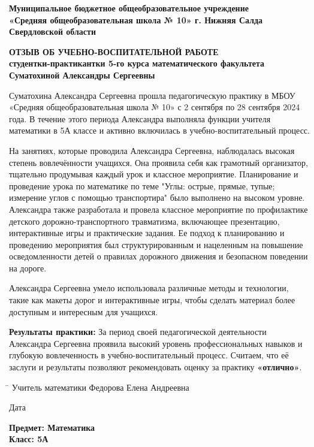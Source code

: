 \documentclass[a4paper,12pt]{article}
\begin{document}
\begin{center}
    \textbf{Муниципальное бюджетное общеобразовательное учреждение}\\
    \textbf{«Средняя общеобразовательная школа № 10» г. Нижняя Салда Свердловской области}\\
    \end{center}
\begin{center}
    \textbf{\large ОТЗЫВ ОБ УЧЕБНО-ВОСПИТАТЕЛЬНОЙ РАБОТЕ}\\
    \textbf{студентки-практикантки 5-го курса математического факультета}\\
    \textbf{Суматохиной Александры Сергеевны}
    \end{center}
\vspace{10mm}

Суматохина Александра Сергеевна прошла педагогическую практику в МБОУ «Средняя общеобразовательная школа № 10» с 2 сентября по 28 сентября 2024 года. В течение этого периода Александра выполняла функции учителя математики в 5А классе и активно включилась в учебно-воспитательный процесс.

На занятиях, которые проводила Александра Сергеевна, наблюдалась высокая степень вовлечённости учащихся. Она проявила себя как грамотный организатор, тщательно продумывая каждый урок и классное мероприятие. Планирование и проведение урока по математике по теме "Углы: острые, прямые, тупые; измерение углов с помощью транспортира" было выполнено на высоком уровне. Александра также разработала и провела классное мероприятие по профилактике детского дорожно-транспортного травматизма, включающее презентацию, интерактивные игры и практические задания. Ее подход к планированию и проведению мероприятия был структурированным и нацеленным на повышение осведомленности детей о правилах дорожного движения и безопасном поведении на дороге.

Александра Сергеевна умело использовала различные методы и технологии, такие как макеты дорог и интерактивные игры, чтобы сделать материал более доступным и интересным для учащихся.

\vspace{5mm}

\textbf{Результаты практики:} За период своей педагогической деятельности Александра Сергеевна проявила высокий уровень профессиональных навыков и глубокую вовлеченность в учебно-воспитательный процесс. Считаем, что её заслуги и результаты позволяют рекомендовать оценку за практику \textbf{«отлично»}.

\vspace{10mm}

\noindent
\begin{tabbing}
\hspace{4cm} \= \kill
Учитель математики \> \underline{\hspace{5cm}} Федорова Елена Андреевна
\end{tabbing}
Дата \underline{\hspace{5cm}}

\vspace{5mm}

\noindent
\textbf{Предмет: Математика}\\
\textbf{Класс: 5А}\\
\end{document}
